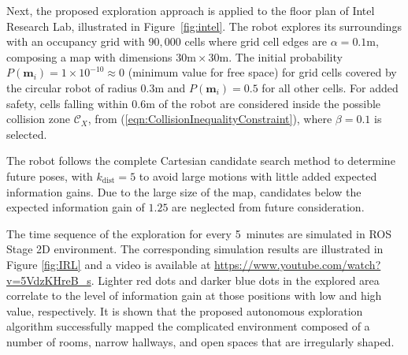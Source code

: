 \documentclass[smallextended]{svjour3}       %
\newcommand{\refeqn}[1]{(\ref{eqn:#1})}
\newcommand{\WriteBlue}[1]{{\color{blue}\protect #1}}
\begin{document}


Next, the proposed exploration approach is applied to the floor plan of Intel Research Lab, illustrated in Figure~\ref{fig:intel}.
The robot explores its surroundings with an occupancy grid with $90,000$ cells where grid cell edges are $\alpha=0.1$m, composing a map with dimensions $30\text{m}\times30\text{m}$.
The initial probability $P(\mathbf{m}_i)=1\times10^{-10}\approx0$ (minimum value for free space) for grid cells covered by the circular robot of radius $0.3$m and $P(\mathbf{m}_i)=0.5$ for all other cells.
For added safety, cells falling within $0.6$m of the robot are considered inside the possible collision zone $\mathcal{C}_X$, from \refeqn{CollisionInequalityConstraint}, where $\beta=0.1$ is selected. 

The robot follows the complete Cartesian candidate search method to determine future poses, with $k_\text{dist}=5$ to avoid large motions with little added expected information gains. Due to the large size of the map, candidates below the expected information gain of $1.25$ are neglected from future consideration.

The time sequence of the exploration for every 5~minutes are simulated in ROS Stage 2D environment. The corresponding simulation results are illustrated in Figure \ref{fig:IRL} and a video is available at \href{https://www.youtube.com/watch?v=5VdzKHreB_s}{\WriteBlue{https://www.youtube.com/watch?v=5VdzKHreB\_s}}.
Lighter red dots and darker blue dots in the explored area correlate to the level of information gain at those positions with low and high value, respectively. It is shown that the proposed autonomous exploration algorithm successfully mapped the complicated environment composed of a number of rooms, narrow hallways, and open spaces that are irregularly shaped.
\end{document}
